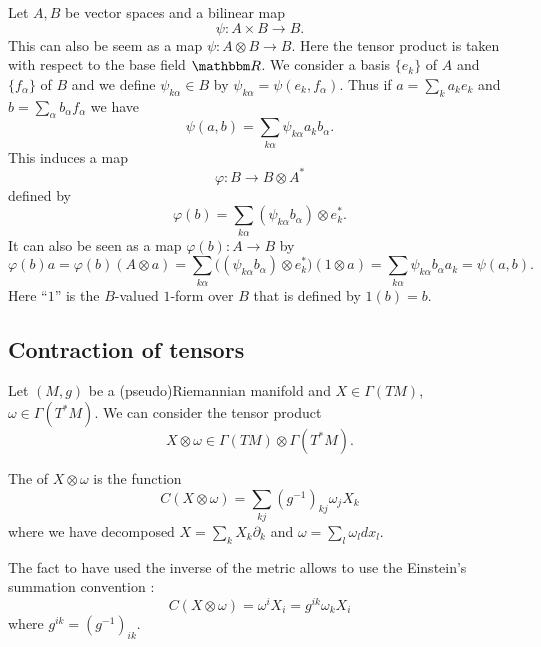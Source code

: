 Let \( A,B\) be vector spaces and a bilinear map
\begin{equation}
    \psi\colon A\times B\to B.
\end{equation}
This can also be seem as a map \( \psi\colon A\otimes B\to B\). Here the tensor product is taken with respect to the base field \( \eR\).
We consider a basis \( \{ e_k \}\) of \( A\) and \( \{ f_{\alpha} \}\) of \( B\) and we define \( \psi_{k\alpha}\in B\) by \( \psi_{k\alpha}=\psi(e_k,f_\alpha)\). Thus if \( a=\sum_ka_ke_k\) and \( b=\sum_{\alpha}b_{\alpha}f_{\alpha}\) we have
\begin{equation}
    \psi(a,b)=\sum_{k\alpha}\psi_{k\alpha}a_kb_\alpha.
\end{equation}
  This induces a map 
\begin{equation}
    \varphi\colon B\to B\otimes A^*
\end{equation}
defined by
\begin{equation}
    \varphi(b)=\sum_{k\alpha}(\psi_{k\alpha}b_{\alpha})\otimes e_k^*.
\end{equation}
It can also be seen as a map \( \varphi(b)\colon A\to B\) by
\begin{equation}
    \varphi(b)a=\varphi(b)(A\otimes a)=\sum_{k\alpha} \big( (\psi_{k\alpha}b_{\alpha})\otimes e_{k}^*\big)(1\otimes a)=\sum_{k\alpha}\psi_{k\alpha}b_{\alpha}a_k=\psi(a,b).
\end{equation}
Here ``\( 1\)'' is the \( B\)-valued \( 1\)-form over \( B\) that is defined by \( 1(b)=b\).

\subsection{Contraction of tensors}

Let \( (M,g)\) be a (pseudo)Riemannian manifold and \( X\in\Gamma(TM)\), \( \omega\in\Gamma(T^*M)\). We can consider the tensor product
\begin{equation}    
    X\otimes \omega\in \Gamma(TM)\otimes \Gamma(T^*M).
\end{equation}
\begin{definition}
    The  of \( X\otimes \omega\) is the function
    \begin{equation}    \label{EQooDODKooOxCzZP}
        C(X\otimes \omega)=\sum_{kj}(g^{-1})_{kj}\omega_jX_k
    \end{equation}
    where we have decomposed \( X=\sum_kX_k\partial_k\) and \( \omega=\sum_l\omega_ldx_l  \).
\end{definition}
The fact to have used the inverse of the metric allows to use the Einstein's summation convention : 
\begin{equation}
    C(X\otimes \omega)=\omega^iX_i=g^{ik}\omega_kX_i
\end{equation}
where \( g^{ik}=(g^{-1})_{ik}\).

